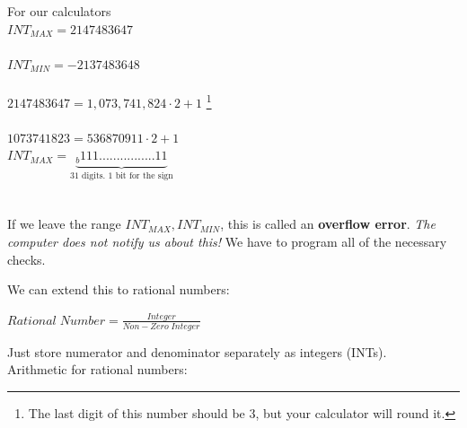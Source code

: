 \documentclass[a4paper,12pt,]{report}
\newenvironment{myindentpar}[1]
{
	\begin{list}{}
          	{\setlength{\leftmargin}{#1}}
          	\item[]
 }
  {\end{list}}
\begin{document}
\begin{figure}[!htb]
	\label{fig: Decimal to Binary Conversion}
\end{figure}

	For our calculators\\
	$INT_{MAX} = 2147483647$\\ \\
	$INT_{MIN} =-2137483648$\\ \\

	$2147483647 = 1,073,741,824 \cdot 2+1$
	\footnote[3]{The last digit of this number should be 3, but your calculator will round it.} \\[5pt]\\
	$1073741823=536870911\cdot2+1$\\

	$INT_{MAX}=\underbrace{_b111................11}_{\text{31 digits. 1 bit for the sign}}$\\ \\ \\

	If we leave the range $INT_{MAX}, INT_{MIN}$, this is called an \textbf{overflow error}.
	\textit{The computer does not notify us about this!} We have to program all of the necessary 
	checks.

\begin{myindentpar}{1cm}
\end{myindentpar}

\bigskip

	We can extend this to rational numbers:

\begin{center}
	$Rational \; Number=$\large{$\frac{Integer}{Non-Zero\;Integer}$}
\end{center}

	Just store numerator and denominator separately as integers (INTs).\\
	Arithmetic for rational numbers:
\end{document}
